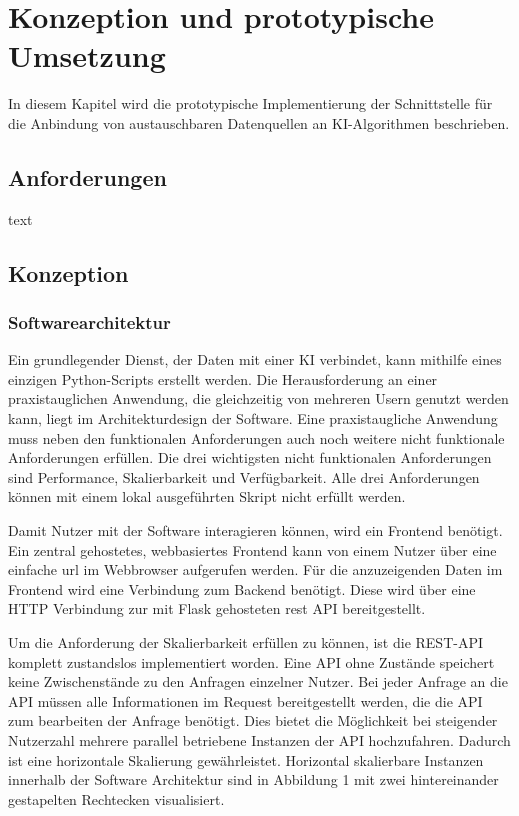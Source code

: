 \section{Konzeption und prototypische Umsetzung}
In diesem Kapitel wird die prototypische Implementierung der Schnittstelle für die Anbindung von austauschbaren Datenquellen an KI-Algorithmen beschrieben.
\subsection{Anforderungen}
text
\subsection{Konzeption}

\subsubsection{Softwarearchitektur}
Ein grundlegender Dienst, der Daten mit einer KI verbindet, kann mithilfe eines einzigen Python-Scripts erstellt werden. Die Herausforderung an einer praxistauglichen Anwendung, die gleichzeitig von mehreren Usern genutzt werden kann, liegt im  Architekturdesign der Software. Eine praxistaugliche Anwendung muss neben den funktionalen Anforderungen auch noch weitere nicht funktionale Anforderungen erfüllen. Die drei wichtigsten nicht funktionalen Anforderungen sind Performance, Skalierbarkeit und Verfügbarkeit. Alle drei Anforderungen können mit einem lokal ausgeführten Skript nicht erfüllt werden. 

Damit Nutzer mit der Software interagieren können, wird ein Frontend benötigt. Ein zentral gehostetes, webbasiertes Frontend kann von einem Nutzer über eine einfache \ac{url} im Webbrowser aufgerufen werden. Für die anzuzeigenden Daten im Frontend wird eine Verbindung zum Backend benötigt. Diese wird über eine HTTP Verbindung zur mit Flask gehosteten \ac{rest} API bereitgestellt.

Um die Anforderung der Skalierbarkeit erfüllen zu können, ist die REST-API komplett zustandslos implementiert worden. Eine API ohne Zustände speichert keine Zwischenstände zu den Anfragen einzelner Nutzer. Bei jeder Anfrage an die API müssen alle Informationen im Request bereitgestellt werden, die die API zum bearbeiten der Anfrage benötigt. Dies bietet die Möglichkeit bei steigender Nutzerzahl mehrere parallel betriebene Instanzen der API hochzufahren. Dadurch ist eine horizontale Skalierung gewährleistet. Horizontal skalierbare Instanzen innerhalb der Software Architektur sind in Abbildung 1 mit zwei hintereinander gestapelten Rechtecken visualisiert.

